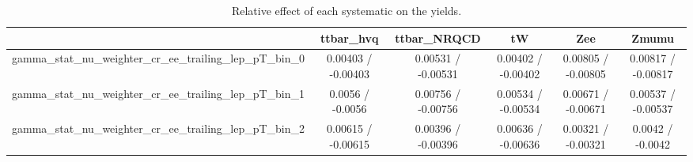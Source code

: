 \documentclass[10pt]{article}
\begin{document}
\begin{table}[htbp]
\begin{center}
\begin{tabular}{|c|c|c|c|c|c|}
\hline 
      & ttbar_hvq      & ttbar_NRQCD      & tW      & Zee      & Zmumu \\ 
\hline 
  gamma_stat_nu_weighter_cr_ee_trailing_lep_pT_bin_0 & 0.00403 / -0.00403 & 0.00531 / -0.00531 & 0.00402 / -0.00402 & 0.00805 / -0.00805 & 0.00817 / -0.00817 \\ 
  gamma_stat_nu_weighter_cr_ee_trailing_lep_pT_bin_1 & 0.0056 / -0.0056 & 0.00756 / -0.00756 & 0.00534 / -0.00534 & 0.00671 / -0.00671 & 0.00537 / -0.00537 \\ 
  gamma_stat_nu_weighter_cr_ee_trailing_lep_pT_bin_2 & 0.00615 / -0.00615 & 0.00396 / -0.00396 & 0.00636 / -0.00636 & 0.00321 / -0.00321 & 0.0042 / -0.0042 \\ 
\hline 
\end{tabular} 
\caption{Relative effect of each systematic on the yields.} 
\end{center} 
\end{table} 
\end{document}
